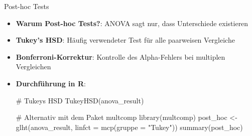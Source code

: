 \documentclass[
  ignorenonframetext,
]{beamer}
\newenvironment{Shaded}{\begin{snugshade}}{\end{snugshade}}
\newcommand{\AttributeTok}[1]{\textcolor[rgb]{0.40,0.45,0.13}{#1}}
\newcommand{\CommentTok}[1]{\textcolor[rgb]{0.37,0.37,0.37}{#1}}
\newcommand{\FunctionTok}[1]{\textcolor[rgb]{0.28,0.35,0.67}{#1}}
\newcommand{\NormalTok}[1]{\textcolor[rgb]{0.00,0.23,0.31}{#1}}
\newcommand{\OtherTok}[1]{\textcolor[rgb]{0.00,0.23,0.31}{#1}}
\newcommand{\StringTok}[1]{\textcolor[rgb]{0.13,0.47,0.30}{#1}}
\begin{document}
\begin{frame}[fragile]{Post-hoc Tests}
\protect{}\label{post-hoc-tests-1}
\begin{itemize}
\item
  \textbf{Warum Post-hoc Tests?}: ANOVA sagt nur, dass Unterschiede
  existieren
\item
  \textbf{Tukey's HSD}: Häufig verwendeter Test für alle paarweisen
  Vergleiche
\item
  \textbf{Bonferroni-Korrektur}: Kontrolle des Alpha-Fehlers bei
  multiplen Vergleichen
\item
  \textbf{Durchführung in R}:

\begin{Shaded}
\begin{Highlighting}[]
\CommentTok{\# Tukey\textquotesingle{}s HSD}
\FunctionTok{TukeyHSD}\NormalTok{(anova\_result)}

\CommentTok{\# Alternativ mit dem Paket \textquotesingle{}multcomp\textquotesingle{}}
\FunctionTok{library}\NormalTok{(multcomp)}
\NormalTok{post\_hoc }\OtherTok{\textless{}{-}} \FunctionTok{glht}\NormalTok{(anova\_result, }\AttributeTok{linfct =} \FunctionTok{mcp}\NormalTok{(}\AttributeTok{gruppe =} \StringTok{"Tukey"}\NormalTok{))}
\FunctionTok{summary}\NormalTok{(post\_hoc)}
\end{Highlighting}
\end{Shaded}
\end{itemize}
\end{frame}
\end{document}

